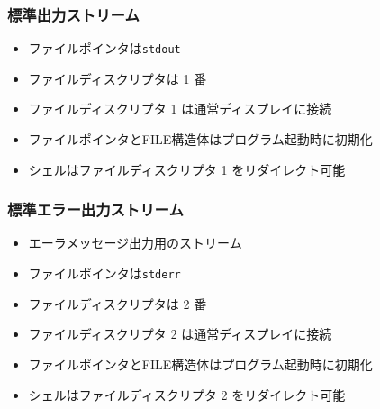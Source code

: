 \documentclass{beamer}                 %
\begin{document}
\begin{frame}
  \frametitle{標準出力ストリーム}
  \begin{itemize}
  \item ファイルポインタは\texttt{stdout}
  \item ファイルディスクリプタは 1 番
  \item ファイルディスクリプタ 1 は通常ディスプレイに接続
  \item ファイルポインタとFILE構造体はプログラム起動時に初期化
  \item シェルはファイルディスクリプタ 1 をリダイレクト可能
  \end{itemize}
\end{frame}

\begin{frame}
  \frametitle{標準エラー出力ストリーム}
  \begin{itemize}
  \item エーラメッセージ出力用のストリーム
  \item ファイルポインタは\texttt{stderr}
  \item ファイルディスクリプタは 2 番
  \item ファイルディスクリプタ 2 は通常ディスプレイに接続
  \item ファイルポインタとFILE構造体はプログラム起動時に初期化
  \item シェルはファイルディスクリプタ 2 をリダイレクト可能
  \end{itemize}
\end{frame}
\end{document}
